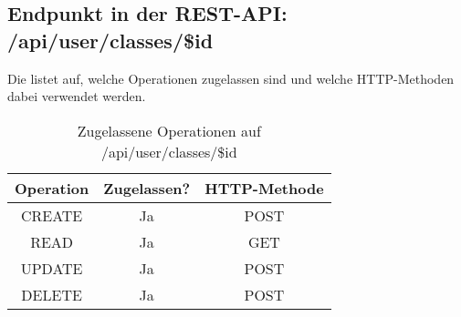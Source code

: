 \subsection{Endpunkt in der REST-API: /api/user/classes/\$id}
Die  listet auf, welche Operationen zugelassen sind und welche HTTP-Methoden dabei verwendet werden. 

\begin{table}[!htbp]
	\begin{tabular}{|c|c|c|}
		\hline
			\textbf{Operation} & \textbf{Zugelassen?} & \textbf{HTTP-Methode} \\ \hline
			CREATE & Ja & POST \\ \hline 
			READ & Ja & GET \\ \hline
			UPDATE & Ja & POST \\ \hline 
			DELETE & Ja & POST \\ \hline
	\end{tabular}

		\caption{Zugelassene Operationen auf /api/user/classes/\$id}
		\label{tab:end:rest:api:user:classes:id:meth}
\end{table}


